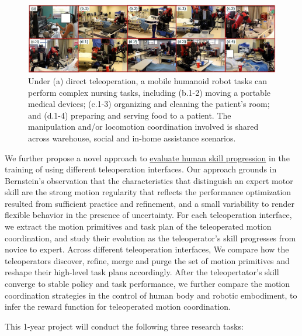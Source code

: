 \begin{figure}[h!!]
\centering
\includegraphics[width=0.99\linewidth]{fig//NursingTask}
\caption{Under (a) direct teleoperation, a mobile humanoid robot tasks can perform complex nursing tasks, including (b.1-2) moving a portable medical devices; (c.1-3) organizing and cleaning the patient's room; and (d.1-4) preparing and serving food to a patient. The manipulation and/or locomotion coordination involved is shared across warehouse, social and in-home assistance scenarios. }
\label{NursingTask}
\vspace{1ex}
\end{figure}

We further propose a novel approach to \underline{evaluate human skill progression} in the training of using different teleoperation interfaces. Our approach grounds in Bernstein's observation that the characteristics that distinguish an expert motor skill are the strong motion regularity that reflects the performance optimization resulted from sufficient practice and refinement, and a small variability to render flexible behavior in the presence of uncertainty. For each teleoperation interface, we extract the motion primitives and task plan of the teleoperated motion coordination, and study their evolution as the teleoperator's skill progresses from novice to expert. Across different teleoperation interfaces, We compare how the teleoperators discover, refine, merge and purge the set of motion primitives and reshape their high-level task plans accordingly. After the teleopertator's skill converge to stable policy and task performance, we further compare the motion coordination strategies in the control of human body and robotic embodiment, to infer the reward function for teleoperated motion coordination. 

This 1-year project will conduct the following three research tasks: 

